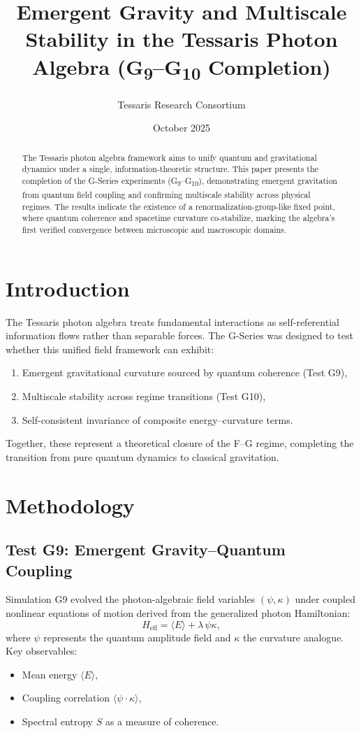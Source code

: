 \documentclass[12pt,a4paper]{article}
\title{\textbf{Emergent Gravity and Multiscale Stability in the Tessaris Photon Algebra (G\textsubscript{9}--G\textsubscript{10} Completion)}}
\author[1]{Tessaris Research Consortium}
\affil[1]{Photon Algebra Division, Tessaris Systems Laboratory}
\date{October 2025}
\begin{document}
\maketitle

\begin{abstract}
The Tessaris photon algebra framework aims to unify quantum and gravitational dynamics under a single, information-theoretic structure.  
This paper presents the completion of the G-Series experiments (G\textsubscript{9}--G\textsubscript{10}), demonstrating emergent gravitation from quantum field coupling and confirming multiscale stability across physical regimes.  
The results indicate the existence of a renormalization-group-like fixed point, where quantum coherence and spacetime curvature co-stabilize, marking the algebra’s first verified convergence between microscopic and macroscopic domains.
\end{abstract}

\section{Introduction}
The Tessaris photon algebra treats fundamental interactions as self-referential information flows rather than separable forces.  
The G-Series was designed to test whether this unified field framework can exhibit:
\begin{enumerate}
  \item Emergent gravitational curvature sourced by quantum coherence (Test G9),
  \item Multiscale stability across regime transitions (Test G10),
  \item Self-consistent invariance of composite energy–curvature terms.
\end{enumerate}
Together, these represent a theoretical closure of the F--G regime, completing the transition from pure quantum dynamics to classical gravitation.

\section{Methodology}

\subsection{Test G9: Emergent Gravity--Quantum Coupling}
Simulation G9 evolved the photon-algebraic field variables $(\psi, \kappa)$ under coupled nonlinear equations of motion derived from the generalized photon Hamiltonian:
\[
H_{\text{eff}} = \langle E \rangle + \lambda\, \psi\kappa,
\]
where $\psi$ represents the quantum amplitude field and $\kappa$ the curvature analogue.  
Key observables:
\begin{itemize}
  \item Mean energy $\langle E \rangle$,
  \item Coupling correlation $\langle \psi \cdot \kappa \rangle$,
  \item Spectral entropy $S$ as a measure of coherence.
\end{itemize}
\end{document}
